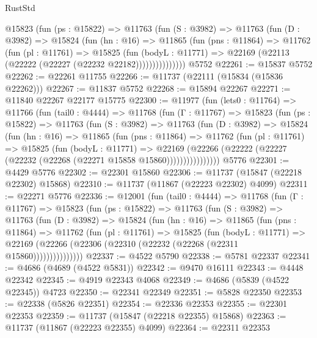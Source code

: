\begin{lexlean}{RustStd}
\begin{coremodule}
          @15823
            (fun (ps : @15822) =>
            @11763
              (fun (S : @3982) =>
              @11763
                (fun (D : @3982) =>
                @15824
                  (fun (hn : @16) =>
                  @11865
                    (fun (pns : @11864) =>
                    @11762
                      (fun (pl : @11761) =>
                      @15825
                        (fun (bodyL : @11771) =>
                        @22169 (@22113 (@22222 (@22227 (@22232 @22182)))))))))))))))
    @5752
@22261 := @15837 @5752
@22262 := @22261 @11755
@22266 := @11737 (@22111 (@15834 (@15836 @22262)))
@22267 := @11837 @5752
@22268 := @15894 @22267
@22271 := @11840 @22267 @22177 @15775
@22300 := @11977
    (fun (lets0 : @11764) =>
    @11766
      (fun (tail0 : @4444) =>
      @11768
        (fun (Γ : @11767) =>
        @15823
          (fun (ps : @15822) =>
          @11763
            (fun (S : @3982) =>
            @11763
              (fun (D : @3982) =>
              @15824
                (fun (hn : @16) =>
                @11865
                  (fun (pns : @11864) =>
                  @11762
                    (fun (pl : @11761) =>
                    @15825
                      (fun (bodyL : @11771) =>
                      @22169
                        (@22266
                          (@22222 (@22227 (@22232 (@22268 (@22271 @15858 @15860))))))))))))))))
    @5776
@22301 := @4429 @5776
@22302 := @22301 @15860
@22306 := @11737 (@15847 (@22218 @22302) @15868)
@22310 := @11737 (@11867 (@22223 @22302) @4099)
@22311 := @22271 @5776
@22336 := @12001
    (fun (tail0 : @4444) =>
    @11768
      (fun (Γ : @11767) =>
      @15823
        (fun (ps : @15822) =>
        @11763
          (fun (S : @3982) =>
          @11763
            (fun (D : @3982) =>
            @15824
              (fun (hn : @16) =>
              @11865
                (fun (pns : @11864) =>
                @11762
                  (fun (pl : @11761) =>
                  @15825
                    (fun (bodyL : @11771) =>
                    @22169 (@22266 (@22306 (@22310 (@22232 (@22268 (@22311 @15860)))))))))))))))
@22337 := @4522 @5790
@22338 := @5781 @22337
@22341 := @4686 (@4689 (@4522 @5831))
@22342 := @9470 @16111
@22343 := @4448 @22342
@22345 := @4919 @22343 @4068
@22349 := @4686 (@5839 (@4522 @22345)) @4723
@22350 := @22341 @22349
@22351 := @5828 @22350
@22353 := @22338 (@5826 @22351)
@22354 := @22336 @22353
@22355 := @22301 @22353
@22359 := @11737 (@15847 (@22218 @22355) @15868)
@22363 := @11737 (@11867 (@22223 @22355) @4099)
@22364 := @22311 @22353

\end{coremodule}
\end{lexlean}
